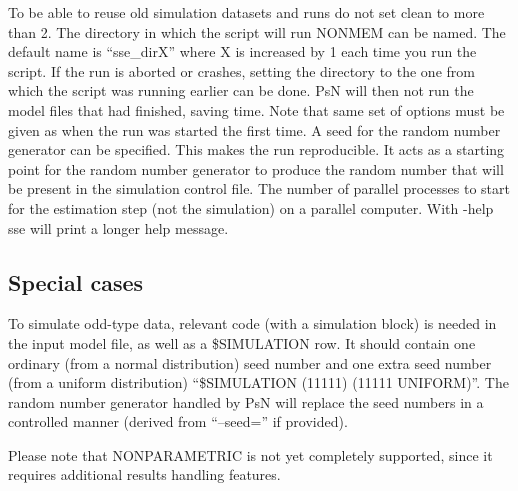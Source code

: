 \begin{optionlist}
To be able to reuse old simulation datasets and runs do not set clean to more than 2. 
\nextopt
{}
The directory in which the script will run NONMEM can be named. The default name is “sse\_dirX” where X is increased by 1 each time you run the script. If the run is aborted or crashes, setting the directory to the one from which the script was running earlier can be done. PsN will then not run the model files that had finished, saving time. Note that same set of options must be given as when the run was started the first time. 
\nextopt
{}
A seed for the random number generator can be specified. This makes the run reproducible. It acts as a starting point for the random number generator to produce the random number that will be present in the simulation control file. 
\nextopt
{}
The number of parallel processes to start for the estimation step (not the simulation) on a parallel computer. 
\nextopt
{}
With -help sse will print a longer help message. 
\nextopt
\end{optionlist}


\subsection{Special cases}
To simulate odd-type data, relevant code (with a simulation block) is needed in the input model file, as well as a \$SIMULATION row. It should contain one ordinary (from a normal distribution) seed number and one extra seed number (from a uniform distribution) “\$SIMULATION (11111) (11111 UNIFORM)”. The random number generator handled by PsN will replace the seed numbers in a controlled manner (derived from “–seed=” if provided).

Please note that NONPARAMETRIC is not yet completely supported, since it requires additional results handling features.

